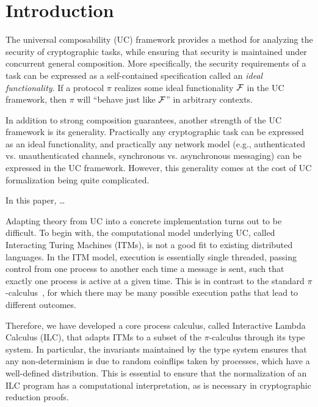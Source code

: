 \section{Introduction}
\label{sec:introduction}

The universal composability (UC) framework provides a method for analyzing the
security of cryptographic tasks, while ensuring that security is maintained
under concurrent general composition. More specifically, the security
requirements of a task can be expressed as a self-contained specification called
an \emph{ideal functionality}. If a protocol $\pi$ realizes some ideal
functionality $\mathcal{{F}}$ in the UC framework, then $\pi$ will ``behave just like
$\mathcal{{F}}$'' in arbitrary contexts.

In addition to strong composition guarantees, another strength of the UC
framework is its generality. Practically any cryptographic task can be expressed
as an ideal functionality, and practically any network model (e.g.,
authenticated vs. unauthenticated channels, synchronous vs. asynchronous
messaging) can be expressed in the UC framework. However, this generality comes
at the cost of UC formalization being quite complicated.

In this paper, \ldots

Adapting theory from UC into a concrete implementation turns out to be
difficult. To begin with, the computational model underlying UC, called
Interacting Turing Machines (ITMs), is not a good fit to existing distributed
languages. In the ITM model, execution is essentially single threaded, passing
control from one process to another each time a message is sent, such that
exactly one process is active at a given time. This is in contrast to the
standard $\pi$-calculus~\cite{milner1999communicating}, for which there may be
many possible execution paths that lead to different outcomes.

Therefore, we have developed a core process calculus, called Interactive Lambda
Calculus (ILC), that adapts ITMs to a subset of the $\pi$-calculus through its
type system. In particular, the invariants maintained by the type system ensures
that any non-determinism is due to random coinflips taken by processes, which
have a well-defined distribution. This is essential to ensure that the
normalization of an ILC program has a computational interpretation, as is
necessary in cryptographic reduction proofs.


